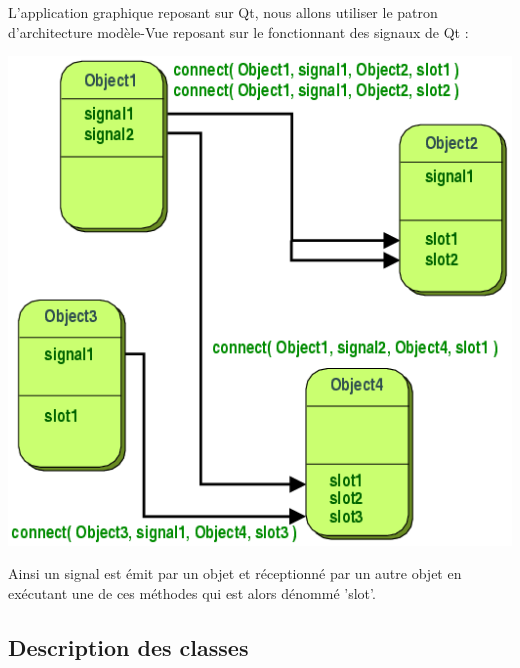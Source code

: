 \documentclass{../res/univ-projet}
\begin{document}
    L'application graphique reposant sur Qt, nous allons utiliser le patron d'architecture modèle-Vue
    reposant sur le fonctionnant des signaux de Qt :
    \begin{center}
    \includegraphics[scale=.5]{../res/MV.png}
    \end{center}

    Ainsi un signal est émit par un objet et réceptionné par un autre objet en exécutant une de ces méthodes
    qui est alors dénommé 'slot'.

  \subsection{Description des classes} %
      
\end{document}
